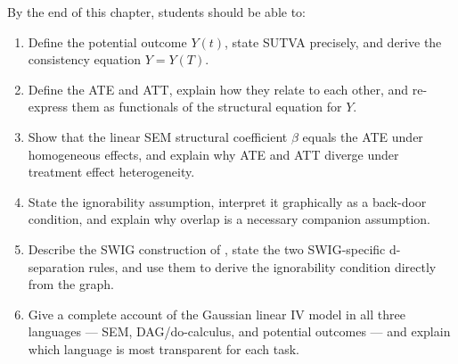 \documentclass[master.tex]{subfiles}
\begin{document}

\begin{tcolorbox}[defstyle, title={Learning Objectives}]
By the end of this chapter, students should be able to:
\begin{enumerate}
  \item Define the potential outcome $Y(t)$, state SUTVA precisely, and
        derive the consistency equation $Y = Y(T)$.
  \item Define the ATE and ATT, explain how they relate to each other,
        and re-express them as functionals of the structural equation for $Y$.
  \item Show that the linear SEM structural coefficient $\beta$ equals
        the ATE under homogeneous effects, and explain why ATE and ATT
        diverge under treatment effect heterogeneity.
  \item State the ignorability assumption, interpret it graphically as a
        back-door condition, and explain why overlap is a necessary
        companion assumption.
  \item Describe the SWIG construction of \citet{richardson2014ace},
        state the two SWIG-specific d-separation rules, and use them
        to derive the ignorability condition directly from the graph.
  \item Give a complete account of the Gaussian linear IV model in all
        three languages --- SEM, DAG/do-calculus, and potential outcomes
        --- and explain which language is most transparent for each task.
\end{enumerate}
\end{tcolorbox}

\end{document}
